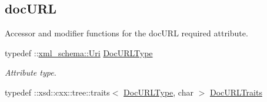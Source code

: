\subsection*{docURL}
\label{_amgrpbf763bdce9fbae56709d9cba633456ce}
Accessor and modifier functions for the docURL required attribute. \begin{DoxyCompactItemize}
\item 
\hypertarget{classopenstack_1_1xml_1_1Version_aed74beb6af9dc70c3ec21ba445627cec}{
typedef ::\hyperlink{namespacexml__schema_ae14d61a2e71e44fa4b46c9492c59b44d}{xml\_\-schema::Uri} \hyperlink{classopenstack_1_1xml_1_1Version_aed74beb6af9dc70c3ec21ba445627cec}{DocURLType}}
\label{classopenstack_1_1xml_1_1Version_aed74beb6af9dc70c3ec21ba445627cec}

\begin{DoxyCompactList}\small\item\em Attribute type. \item\end{DoxyCompactList}\item 
\hypertarget{classopenstack_1_1xml_1_1Version_a200ea39fc3f0c55e1b3f3d545f50c13e}{
typedef ::xsd::cxx::tree::traits$<$ \hyperlink{classopenstack_1_1xml_1_1Version_aed74beb6af9dc70c3ec21ba445627cec}{DocURLType}, char $>$ \hyperlink{classopenstack_1_1xml_1_1Version_a200ea39fc3f0c55e1b3f3d545f50c13e}{DocURLTraits}}
\label{classopenstack_1_1xml_1_1Version_a200ea39fc3f0c55e1b3f3d545f50c13e}


\end{DoxyCompactItemize}
